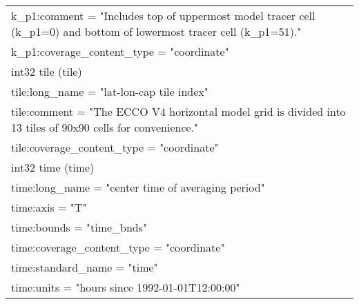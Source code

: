 \begin{longtable}{|p{\textwidth}|}
\rowcolor{Apricot}\hspace{0.5cm}\hspace{0.5cm}k\_p1:comment = "Includes top of uppermost model tracer cell (k\_p1=0) and bottom of lowermost tracer cell (k\_p1=51)."\\
\rowcolor{Apricot}\hspace{0.5cm}\hspace{0.5cm}k\_p1:coverage\_content\_type = "coordinate"\\
\rowcolor{Apricot}\hspace{0.5cm}int32 tile (tile)\\
\rowcolor{Apricot}\hspace{0.5cm}\hspace{0.5cm}tile:long\_name = "lat-lon-cap tile index"\\
\rowcolor{Apricot}\hspace{0.5cm}\hspace{0.5cm}tile:comment = "The ECCO V4 horizontal model grid is divided into 13 tiles of 90x90 cells for convenience."\\
\rowcolor{Apricot}\hspace{0.5cm}\hspace{0.5cm}tile:coverage\_content\_type = "coordinate"\\
\rowcolor{Apricot}\hspace{0.5cm}int32 time (time)\\
\rowcolor{Apricot}\hspace{0.5cm}\hspace{0.5cm}time:long\_name = "center time of averaging period"\\
\rowcolor{Apricot}\hspace{0.5cm}\hspace{0.5cm}time:axis = "T"\\
\rowcolor{Apricot}\hspace{0.5cm}\hspace{0.5cm}time:bounds = "time\_bnds"\\
\rowcolor{Apricot}\hspace{0.5cm}\hspace{0.5cm}time:coverage\_content\_type = "coordinate"\\
\rowcolor{Apricot}\hspace{0.5cm}\hspace{0.5cm}time:standard\_name = "time"\\
\rowcolor{Apricot}\hspace{0.5cm}\hspace{0.5cm}time:units = "hours since 1992-01-01T12:00:00"\\

\end{longtable}
